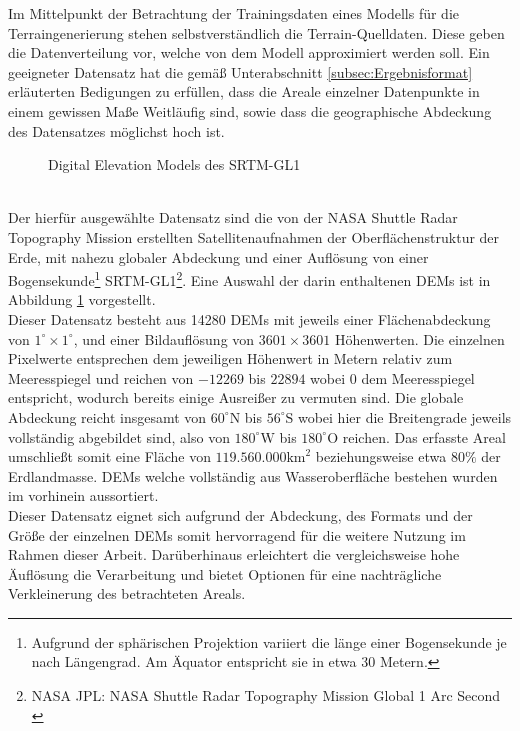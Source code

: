 Im Mittelpunkt der Betrachtung der Trainingsdaten eines Modells für die Terraingenerierung stehen selbstverständlich die Terrain-Quelldaten. Diese geben die Datenverteilung vor, welche von dem Modell approximiert werden soll. Ein geeigneter Datensatz hat die gemäß Unterabschnitt \ref{subsec:Ergebnisformat} erläuterten Bedigungen zu erfüllen, dass die Areale einzelner Datenpunkte in einem gewissen Maße Weitläufig sind, sowie dass die geographische Abdeckung des Datensatzes möglichst hoch ist. 
\begin{figure}[htbp]
    \centering
    \caption{Digital Elevation Models des SRTM-GL1}
    \label{fig:SRTM_Data}
\end{figure} \\
Der hierfür ausgewählte Datensatz sind die von der NASA Shuttle Radar Topography Mission erstellten Satellitenaufnahmen der Oberflächenstruktur der Erde, mit nahezu globaler Abdeckung und einer Auflösung von einer Bogensekunde\footnote{
    Aufgrund der sphärischen Projektion variiert die länge einer Bogensekunde je nach Längengrad. Am Äquator entspricht sie in etwa 30 Metern.
} SRTM-GL1\footnote{
    NASA JPL: NASA Shuttle Radar Topography Mission Global 1 Arc Second
    \cite{nasa2013srtm}
}. Eine Auswahl der darin enthaltenen \ac{DEM}s ist in Abbildung \ref{fig:SRTM_Data} vorgestellt. \\
Dieser Datensatz besteht aus 14280 \ac{DEM}s mit jeweils einer Flächenabdeckung von $1^{\circ}\times1^{\circ}$, und einer Bildauflösung von $3601\times3601$ Höhenwerten. Die einzelnen Pixelwerte entsprechen dem jeweiligen Höhenwert in Metern relativ zum Meeresspiegel und reichen von $-12269$ bis $22894$ wobei $0$ dem Meeresspiegel entspricht, wodurch bereits einige Ausreißer zu vermuten sind. Die globale Abdeckung reicht insgesamt von $60^{\circ}\text{N}$ bis $56^{\circ}\text{S}$ wobei hier die Breitengrade jeweils vollständig abgebildet sind, also von $180^{\circ}\text{W}$ bis $180^{\circ}\text{O}$ reichen. Das erfasste Areal umschließt somit eine Fläche von $119.560.000\text{km}^2$ beziehungsweise etwa $80\%$ der Erdlandmasse. DEMs welche vollständig aus Wasseroberfläche bestehen wurden im vorhinein aussortiert. \\
Dieser Datensatz eignet sich aufgrund der Abdeckung, des Formats und der Größe der einzelnen \ac{DEM}s somit hervorragend für die weitere Nutzung im Rahmen dieser Arbeit. Darüberhinaus erleichtert die vergleichsweise hohe Äuflösung die Verarbeitung und bietet Optionen für eine nachträgliche Verkleinerung des betrachteten Areals.


